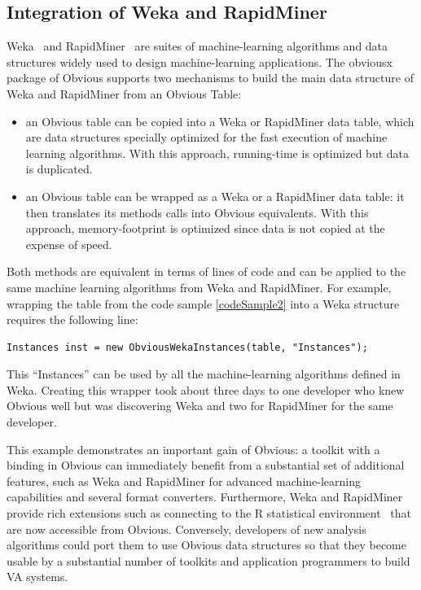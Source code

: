 \subsection{Integration of Weka and RapidMiner}

Weka~\cite{Weka} and RapidMiner~\cite{RapidMiner} are suites of
machine-learning algorithms and data structures widely used to design
machine-learning applications.  The obviousx package of Obvious
supports two mechanisms to build the main data structure of Weka and
RapidMiner from an Obvious Table:
\begin{itemize}[noitemsep,topsep=0pt]
\item an Obvious table can be copied into a Weka or RapidMiner data
  table, which are data structures specially optimized for the fast
  execution of machine learning algorithms.  With this approach,
  running-time is optimized but data is duplicated.
\item an Obvious table can be wrapped as a Weka or a
  RapidMiner data table: it then translates its methods calls into
  Obvious equivalents.  With this approach, memory-footprint is
  optimized since data is not copied at the expense of speed.
\end{itemize}

Both methods are equivalent in terms of lines of code and can be
applied to the same machine learning algorithms from Weka and
RapidMiner.  For example, wrapping the table from the code sample
\ref{codeSample2} into a Weka structure requires the following
line:

\begin{lstlisting}[caption={Wrapping an Obvious Table into Weka Instances},label=wekaExample]
Instances inst = new ObviousWekaInstances(table, "Instances");
\end{lstlisting}


This ``Instances'' can be used by all the machine-learning algorithms
defined in Weka.  Creating this wrapper took about three days to one
developer who knew Obvious well but was discovering Weka and two for
RapidMiner for the same developer.

This example demonstrates an important gain of Obvious: a toolkit with
a binding in Obvious can immediately benefit from a substantial set of
additional features, such as Weka and RapidMiner for advanced
machine-learning capabilities and several format converters.
Furthermore, Weka and RapidMiner provide rich extensions such as
connecting to the R statistical environment~\cite{R} that are now
accessible from Obvious.  Conversely, developers of new analysis
algorithms could port them to use Obvious data structures so that they
become usable by a substantial number of toolkits and application
programmers to build VA systems.


